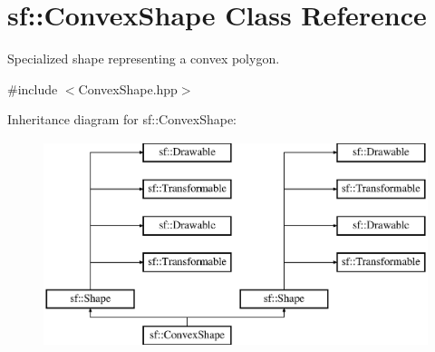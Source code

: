 \hypertarget{classsf_1_1_convex_shape}{\section{sf\-:\-:Convex\-Shape Class Reference}
\label{classsf_1_1_convex_shape}
}


Specialized shape representing a convex polygon.  




{\ttfamily \#include $<$Convex\-Shape.\-hpp$>$}

Inheritance diagram for sf\-:\-:Convex\-Shape\-:\begin{figure}[H]
\begin{center}
\leavevmode
\includegraphics[height=6.000000cm]{classsf_1_1_convex_shape}
\end{center}
\end{figure}
